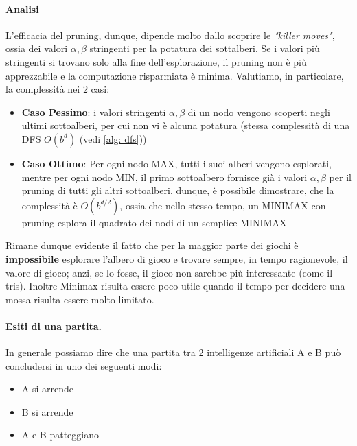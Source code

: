 \paragraph{Analisi}
L'efficacia del pruning, dunque, dipende molto dallo scoprire le \textit{"killer moves"}, ossia dei valori $\alpha,\beta$ stringenti per la potatura dei sottalberi. 
Se i valori più stringenti si trovano solo alla fine dell'esplorazione, il pruning non è più apprezzabile e la computazione risparmiata è minima.
Valutiamo, in particolare, la complessità nei 2 casi:
\begin{itemize}
    \item \textbf{Caso Pessimo}: i valori stringenti $\alpha,\beta$ di un nodo vengono scoperti negli ultimi sottoalberi, per cui non vi è alcuna potatura (stessa complessità di una DFS $O(b^d)$ (vedi \ref{alg: dfs}))
    \item \textbf{Caso Ottimo}: Per ogni nodo MAX, tutti i suoi alberi vengono esplorati, mentre per ogni nodo MIN, il primo sottoalbero fornisce già i valori $\alpha,\beta$ per il pruning di tutti gli altri sottoalberi,
    dunque, è possibile dimostrare, che la complessità è $O(b^{d/2})$, ossia che nello stesso tempo, un MINIMAX con pruning esplora il quadrato dei nodi di un semplice MINIMAX
\end{itemize}
Rimane dunque evidente il fatto che per la maggior parte dei giochi è \textbf{impossibile} esplorare l'albero di gioco e trovare sempre, 
in tempo ragionevole, il valore di gioco; anzi, se lo fosse, il gioco non sarebbe più interessante (come il tris). Inoltre Minimax risulta essere poco utile quando il tempo per decidere
una mossa risulta essere molto limitato.
\paragraph{Esiti di una partita.} In generale possiamo dire che una partita tra 2 intelligenze artificiali A e B può concludersi in uno dei seguenti modi:
\begin{itemize}
    \item A si arrende
    \item B si arrende
    \item A e B patteggiano
\end{itemize} 


